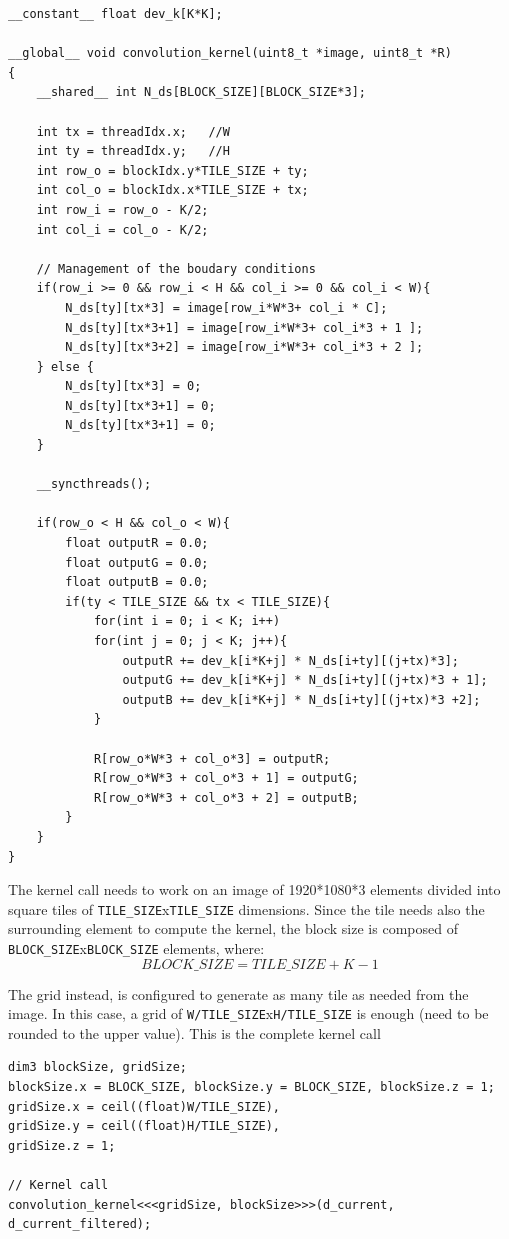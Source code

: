 \documentclass[paper=a4, fontsize=10pt]{scrartcl}	%
\begin{document}
\begin{lstlisting}[style=CStyle]
__constant__ float dev_k[K*K];

__global__ void convolution_kernel(uint8_t *image, uint8_t *R)
{
	__shared__ int N_ds[BLOCK_SIZE][BLOCK_SIZE*3];
	
	int tx = threadIdx.x;   //W
	int ty = threadIdx.y;   //H
	int row_o = blockIdx.y*TILE_SIZE + ty;
	int col_o = blockIdx.x*TILE_SIZE + tx;
	int row_i = row_o - K/2;
	int col_i = col_o - K/2;
	
	// Management of the boudary conditions
	if(row_i >= 0 && row_i < H && col_i >= 0 && col_i < W){
		N_ds[ty][tx*3] = image[row_i*W*3+ col_i * C];
		N_ds[ty][tx*3+1] = image[row_i*W*3+ col_i*3 + 1 ];
		N_ds[ty][tx*3+2] = image[row_i*W*3+ col_i*3 + 2 ];
	} else {
		N_ds[ty][tx*3] = 0;
		N_ds[ty][tx*3+1] = 0;
		N_ds[ty][tx*3+1] = 0;
	}
	
    __syncthreads();

	if(row_o < H && col_o < W){
		float outputR = 0.0;
		float outputG = 0.0;
		float outputB = 0.0;
		if(ty < TILE_SIZE && tx < TILE_SIZE){
			for(int i = 0; i < K; i++)
			for(int j = 0; j < K; j++){
				outputR += dev_k[i*K+j] * N_ds[i+ty][(j+tx)*3];
				outputG += dev_k[i*K+j] * N_ds[i+ty][(j+tx)*3 + 1];
				outputB += dev_k[i*K+j] * N_ds[i+ty][(j+tx)*3 +2];
			}
			
			R[row_o*W*3 + col_o*3] = outputR;
			R[row_o*W*3 + col_o*3 + 1] = outputG;
			R[row_o*W*3 + col_o*3 + 2] = outputB;
		}
	}
}\end{lstlisting}

	The kernel call needs to work on an image of 1920*1080*3 elements divided into square tiles of \texttt{TILE\_SIZE}x\texttt{TILE\_SIZE} dimensions. Since the tile needs also the surrounding element to compute the kernel, the block size is composed of \texttt{BLOCK\_SIZE}x\texttt{BLOCK\_SIZE} elements, where:
	\[
		BLOCK\_SIZE = TILE\_SIZE + K - 1
	\]
	
	The grid instead, is configured to generate as many tile as needed from the image. In this case, a grid of \texttt{W/TILE\_SIZE}x\texttt{H/TILE\_SIZE} is enough (need to be rounded to the upper value).
	This is the complete kernel call
\begin{lstlisting}[style=CStyle]
dim3 blockSize, gridSize;
blockSize.x = BLOCK_SIZE, blockSize.y = BLOCK_SIZE, blockSize.z = 1;
gridSize.x = ceil((float)W/TILE_SIZE),
gridSize.y = ceil((float)H/TILE_SIZE),
gridSize.z = 1;

// Kernel call
convolution_kernel<<<gridSize, blockSize>>>(d_current, d_current_filtered);
\end{lstlisting}
\end{document}
